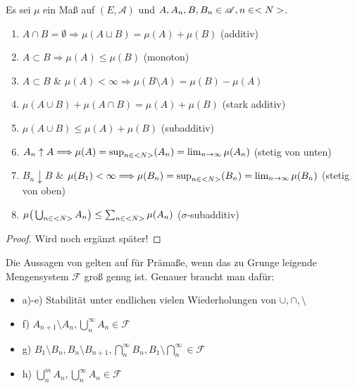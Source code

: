 \begin{proposition}
	Es sei $\mu$ ein Maß auf $(E,\mathscr{A})$ und $A,A_n,B, B_n \in \mathscr{A}, n \in <N>$.
	\begin{enumerate}[label=(\alph*)]
		\item $A\cap B = \emptyset \Longrightarrow \mu(A \sqcup B) = \mu(A) + \mu(B)$ (additiv)
		\item $A\subset B \Longrightarrow \mu(A) \leq \mu(B)$ (monoton)
		\item $A \subset B$ \& $\mu(A) < \infty \Longrightarrow \mu(B\setminus A) = \mu(B) - \mu(A)$
		\item $\mu(A \cup B) + \mu(A\cap B) = \mu(A) + \mu(B)$ (stark additiv)
		\item $\mu(A \cup B) \leq \mu(A) + \mu(B)$ (subadditiv)
		\item $A_n \uparrow A \Longrightarrow \mu(A)  = \sup_{n\in <N>} (A_n) = \lim_{n\to \infty} \mu(A_n)$ (stetig von unten)
		\item $B_n \downarrow B$ \& $\mu(B_1) < \infty \Longrightarrow \mu(B_n)  = \sup_{n\in <N>} (B_n) = \lim_{n\to \infty} \mu(B_n)$ (stetig von oben)
		\item $\mu\big(\bigcup_{n\in <N>} A_n\big) \leq \sum_{n\in <N>} \mu (A_n)$ ($\sigma$-subadditiv)
	\end{enumerate}
\end{proposition}

\begin{proof}
	Wird noch ergänzt später!
\end{proof}

\begin{remark}
	Die Aussagen von  gelten auf für Prämaße, wenn das zu Grunge leigende Mengensystem $\mathscr{F}$ groß genug ist. Genauer braucht man dafür:
	\begin{itemize} %
		\item a)-e) Stabilität unter endlichen vielen Wiederholungen von $\cup,\cap,\setminus$
		\item f) $A_{n+1}\setminus A_n,\bigcup_{n}^{\infty} A_n \in \mathscr{F}$
		\item g) $B_1 \setminus B_n,B_n \setminus B_{n+1},\bigcap_{n}^{\infty} B_n,B_1\setminus \bigcap_{n}^{\infty} \in \mathscr{F}$
		\item h) $\bigcup_{n}^{m} A_n,\bigcup_{n}^{\infty} A_n \in \mathscr{F}$
	\end{itemize}
\end{remark}

